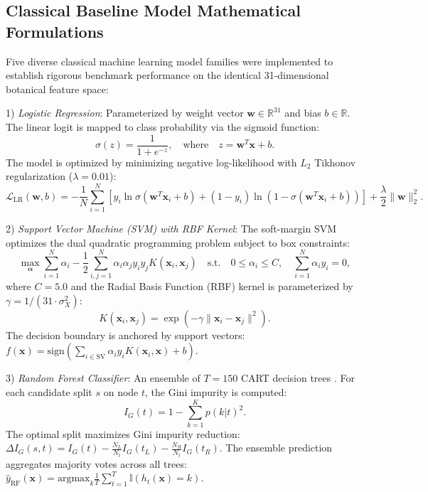 \documentclass{ieeeaccess}
\begin{document}
\subsection{Classical Baseline Model Mathematical Formulations}
Five diverse classical machine learning model families were implemented to establish rigorous benchmark performance on the identical 31-dimensional botanical feature space:

1) \textit{Logistic Regression}: Parameterized by weight vector $\mathbf{w} \in \mathbb{R}^{31}$ and bias $b \in \mathbb{R}$. The linear logit is mapped to class probability via the sigmoid function:
\begin{equation}
\sigma(z) = \frac{1}{1 + e^{-z}}, \quad \text{where} \quad z = \mathbf{w}^T \mathbf{x} + b.
\label{eq:sigmoid}
\end{equation}
The model is optimized by minimizing negative log-likelihood with $L_2$ Tikhonov regularization ($\lambda = 0.01$):
\begin{equation}
\mathcal{L}_{\text{LR}}(\mathbf{w}, b) = -\frac{1}{N}\sum_{i=1}^N \left[ y_i \ln \sigma(\mathbf{w}^T \mathbf{x}_i + b) + (1 - y_i)\ln(1 - \sigma(\mathbf{w}^T \mathbf{x}_i + b)) \right] + \frac{\lambda}{2} \|\mathbf{w}\|_2^2.
\label{eq:lr_loss}
\end{equation}

2) \textit{Support Vector Machine (SVM) with RBF Kernel}: The soft-margin SVM optimizes the dual quadratic programming problem subject to box constraints:
\begin{equation}
\max_{\boldsymbol{\alpha}} \sum_{i=1}^N \alpha_i - \frac{1}{2} \sum_{i,j=1}^N \alpha_i \alpha_j y_i y_j K(\mathbf{x}_i, \mathbf{x}_j) \quad \text{s.t.} \quad 0 \le \alpha_i \le C, \quad \sum_{i=1}^N \alpha_i y_i = 0,
\label{eq:svm_dual}
\end{equation}
where $C = 5.0$ and the Radial Basis Function (RBF) kernel is parameterized by $\gamma = 1 / (31 \cdot \sigma_X^2)$:
\begin{equation}
K(\mathbf{x}_i, \mathbf{x}_j) = \exp\left(-\gamma \|\mathbf{x}_i - \mathbf{x}_j\|^2\right).
\label{eq:rbf_kernel}
\end{equation}
The decision boundary is anchored by support vectors: $f(\mathbf{x}) = \text{sign}\left(\sum_{i \in \text{SV}} \alpha_i y_i K(\mathbf{x}_i, \mathbf{x}) + b\right)$.

3) \textit{Random Forest Classifier}: An ensemble of $T = 150$ CART decision trees \cite{breiman2001random}. For each candidate split $s$ on node $t$, the Gini impurity is computed:
\begin{equation}
I_G(t) = 1 - \sum_{k=1}^K p(k|t)^2.
\label{eq:gini}
\end{equation}
The optimal split maximizes Gini impurity reduction: $\Delta I_G(s, t) = I_G(t) - \frac{N_L}{N_t} I_G(t_L) - \frac{N_R}{N_t} I_G(t_R)$. The ensemble prediction aggregates majority votes across all trees: $\hat{y}_{\text{RF}}(\mathbf{x}) = \text{argmax}_k \frac{1}{T}\sum_{t=1}^T \mathbb{I}(h_t(\mathbf{x}) = k)$.
\end{document}

